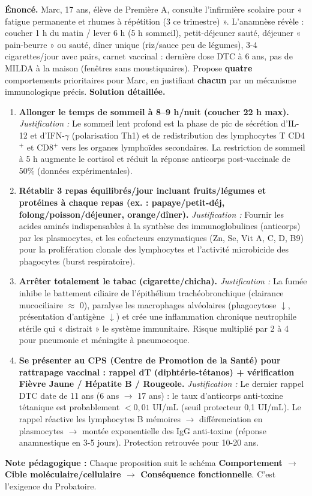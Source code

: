 \documentclass[11pt]{article}
\begin{document}
\begin{exoresolu}
\textbf{Énoncé.} Marc, 17 ans, élève de Première A, consulte l'infirmière scolaire pour « fatigue permanente et rhumes à répétition (3 ce trimestre) ». L'anamnèse révèle : coucher 1 h du matin / lever 6 h (5 h sommeil), petit-déjeuner sauté, déjeuner « pain-beurre » ou sauté, dîner unique (riz/sauce peu de légumes), 3-4 cigarettes/jour avec pairs, carnet vaccinal : dernière dose DTC à 6 ans, pas de MILDA à la maison (fenêtres sans moustiquaires). Propose \textbf{quatre} comportements prioritaires pour Marc, en justifiant \textbf{chacun} par un mécanisme immunologique précis.
\tcblower
\textbf{Solution détaillée.}
\begin{enumerate}
\item \textbf{Allonger le temps de sommeil à 8--9 h/nuit (coucher 22 h max).} 
\textit{Justification :} Le sommeil lent profond est la phase de pic de sécrétion d'IL-12 et d'IFN-$\gamma$ (polarisation Th1) et de redistribution des lymphocytes T CD4$^+$ et CD8$^+$ vers les organes lymphoïdes secondaires. La restriction de sommeil à 5 h augmente le cortisol et réduit la réponse anticorps post-vaccinale de 50\% (données expérimentales).
\item \textbf{Rétablir 3 repas équilibrés/jour incluant fruits/légumes et protéines à chaque repas (ex. : papaye/petit-déj, folong/poisson/déjeuner, orange/dîner).} 
\textit{Justification :} Fournir les acides aminés indispensables à la synthèse des immunoglobulines (anticorps) par les plasmocytes, et les cofacteurs enzymatiques (Zn, Se, Vit A, C, D, B9) pour la prolifération clonale des lymphocytes et l'activité microbicide des phagocytes (burst respiratoire).
\item \textbf{Arrêter totalement le tabac (cigarette/chicha).} 
\textit{Justification :} La fumée inhibe le battement ciliaire de l'épithélium trachéobronchique (clairance mucociliaire $\approx$ 0), paralyse les macrophages alvéolaires (phagocytose $\downarrow$, présentation d'antigène $\downarrow$) et crée une inflammation chronique neutrophile stérile qui « distrait » le système immunitaire. Risque multiplié par 2 à 4 pour pneumonie et méningite à pneumocoque.
\item \textbf{Se présenter au CPS (Centre de Promotion de la Santé) pour rattrapage vaccinal : rappel dT (diphtérie-tétanos) + vérification Fièvre Jaune / Hépatite B / Rougeole.} 
\textit{Justification :} Le dernier rappel DTC date de 11 ans (6 ans $\rightarrow$ 17 ans) : le taux d'anticorps anti-toxine tétanique est probablement $< 0,01$ UI/mL (seuil protecteur 0,1 UI/mL). Le rappel réactive les lymphocytes B mémoires $\rightarrow$ différenciation en plasmocytes $\rightarrow$ montée exponentielle des IgG anti-toxine (réponse anamnestique en 3-5 jours). Protection retrouvée pour 10-20 ans.
\end{enumerate}
\textbf{Note pédagogique :} Chaque proposition suit le schéma \textbf{Comportement $\rightarrow$ Cible moléculaire/cellulaire $\rightarrow$ Conséquence fonctionnelle}. C'est l'exigence du Probatoire.
\end{exoresolu}
\end{document}
